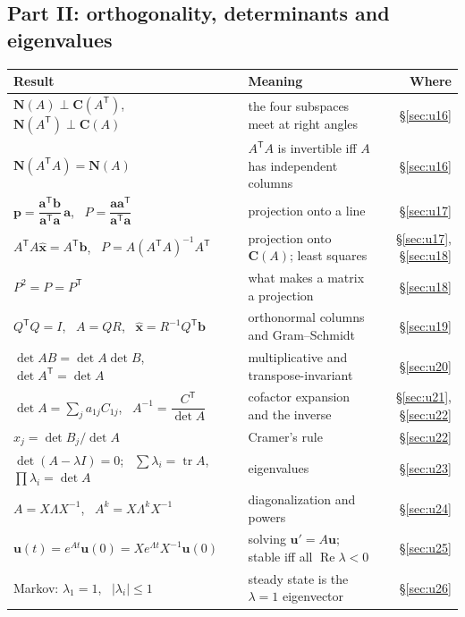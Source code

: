\documentclass[11pt]{article}
\theoremstyle{definition}
\theoremstyle{plain}
\theoremstyle{remark}
\newcommand{\vb}[1]{\boldsymbol{#1}}          %
\newcommand{\T}{^{\mathsf{T}}}                 %
\DeclareMathOperator{\tr}{tr}
\newcommand{\Col}[1]{\mathbf{C}(#1)}            %
\newcommand{\Nul}[1]{\mathbf{N}(#1)}            %
\begin{document}
\subsection*{Part II: orthogonality, determinants and eigenvalues}
\begin{longtable}{@{}p{}p{}r@{}}
\toprule
Result & Meaning & Where \\
\midrule
$\Nul{A}\perp\Col{A\T}$, \ $\Nul{A\T}\perp\Col{A}$ & the four subspaces meet at right angles & \S\ref{sec:u16} \\
$\Nul{A\T A}=\Nul{A}$ & $A\T A$ is invertible iff $A$ has independent columns & \S\ref{sec:u16} \\
$\vb{p}=\dfrac{\vb{a}\T\vb{b}}{\vb{a}\T\vb{a}}\,\vb{a}$, \ $P=\dfrac{\vb{a}\vb{a}\T}{\vb{a}\T\vb{a}}$ & projection onto a line & \S\ref{sec:u17} \\
$A\T A\hat{\vb{x}}=A\T\vb{b}$, \ $P=A(A\T A)^{-1}A\T$ & projection onto $\Col{A}$; least squares & \S\ref{sec:u17}, \S\ref{sec:u18} \\
$P^2=P=P\T$ & what makes a matrix a projection & \S\ref{sec:u18} \\
$Q\T Q=I$, \ $A=QR$, \ $\hat{\vb{x}}=R^{-1}Q\T\vb{b}$ & orthonormal columns and Gram--Schmidt & \S\ref{sec:u19} \\
$\det AB=\det A\det B$, \ $\det A\T=\det A$ & multiplicative and transpose-invariant & \S\ref{sec:u20} \\
$\det A=\sum_j a_{1j}C_{1j}$, \ $A^{-1}=\dfrac{C\T}{\det A}$ & cofactor expansion and the inverse & \S\ref{sec:u21}, \S\ref{sec:u22} \\
$x_j=\det B_j/\det A$ & Cramer's rule & \S\ref{sec:u22} \\
$\det(A-\lambda I)=0$; \ $\sum\lambda_i=\tr A$, \ $\prod\lambda_i=\det A$ & eigenvalues & \S\ref{sec:u23} \\
$A=X\Lambda X^{-1}$, \ $A^k=X\Lambda^kX^{-1}$ & diagonalization and powers & \S\ref{sec:u24} \\
$\vb{u}(t)=e^{At}\vb{u}(0)=Xe^{\Lambda t}X^{-1}\vb{u}(0)$ & solving $\vb{u}'=A\vb{u}$; stable iff all $\operatorname{Re}\lambda<0$ & \S\ref{sec:u25} \\
Markov: $\lambda_1=1$, \ $|\lambda_i|\le1$ & steady state is the $\lambda=1$ eigenvector & \S\ref{sec:u26} \\
\bottomrule
\end{longtable}
\end{document}
